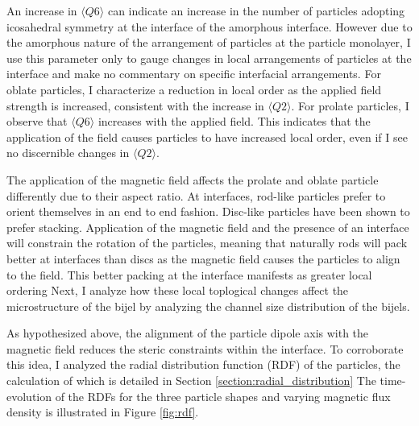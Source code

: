 An increase in $\langle Q6 \rangle$ can indicate an increase in the number of particles adopting icosahedral symmetry at the interface of the amorphous 
interface. \cite{kapfer_jammed_2012} However due to the amorphous nature of the arrangement of particles at the particle monolayer, I use this parameter 
only to gauge changes in local arrangements of particles at the interface and make no commentary on specific interfacial arrangements. For oblate particles, 
I characterize a reduction in local order as the applied field strength is increased, consistent with the increase in $\langle Q2 \rangle$. For prolate 
particles, I observe that $\langle Q6 \rangle$ increases with the applied field. This indicates that the application of the field causes particles to have 
increased local order, even if I see no discernible changes in $\langle Q2 \rangle$. 

The application of the magnetic field affects the prolate and oblate particle differently due to their aspect ratio. At interfaces, rod-like particles 
prefer to orient themselves in an end to end fashion. \cite{eatson_capillary_2023} Disc-like particles have been shown to prefer stacking. \cite{dabat_mesoscale_2018} 
Application of the magnetic field and the presence of an interface will constrain the rotation of the particles, meaning that naturally rods will pack better at 
interfaces than discs as the magnetic field causes the particles to align to the field. This better packing at the interface manifests as greater local ordering 
Next, I analyze how these local toplogical changes affect the microstructure of the bijel by analyzing the channel size distribution of the bijels.

As hypothesized above, the alignment of the particle dipole axis with
the magnetic field reduces the steric constraints within the interface.
To corroborate this idea, I analyzed the radial distribution function
(RDF) of the particles, the calculation of which is detailed in Section
\ref{section:radial_distribution} The time-evolution of the RDFs for the three particle shapes and
varying magnetic flux density is illustrated in Figure \ref{fig:rdf}.

